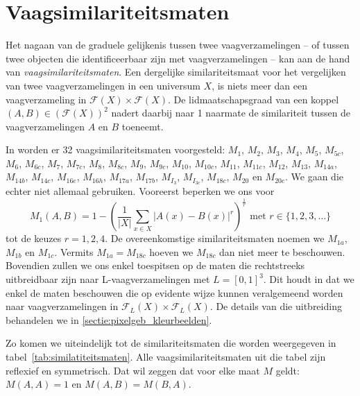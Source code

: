 \section{Vaagsimilariteitsmaten}
\label{sectie:vaagsimilariteitsmaten}

Het nagaan van de graduele gelijkenis tussen twee vaagverzamelingen -- of tussen twee objecten die 
identificeerbaar zijn met vaagverzamelingen -- kan aan de hand van \emph{vaagsimilariteitsmaten}. 
Een dergelijke similariteitsmaat voor het vergelijken van twee vaagverzamelingen in een 
universum $X$, is niets meer dan een vaagverzameling in $\mathcal{F}(X) \times \mathcal{F}(X)$. De 
lidmaatschapsgraad van een koppel $(A,B) \in (\mathcal{F}(X))^2$ nadert daarbij naar 1 naarmate 
de similariteit tussen de vaagverzamelingen $A$ en $B$ toeneemt.

In \cite{vanderweken:similariteitsmaten} worden er 32 vaagsimilariteitsmaten voorgesteld: $M_1$, $M_2$,
$M_3$, $M_4$, $M_5$, $M_{5c}$, $M_6$, $M_{6c}$, $M_7$, $M_{7c}$, $M_8$, $M_{8c}$, $M_9$, $M_{9c}$,
$M_{10}$, $M_{10c}$, $M_{11}$, $M_{11c}$, $M_{12}$, $M_{13}$, $M_{14a}$, $M_{14b}$, $M_{14c}$, 
$M_{16e}$, $M_{16h}$, $M_{17a}$, $M_{17b}$, $M_{I_3}$, $M_{I_{3c}}$, $M_{18c}$, $M_{20}$ en $M_{20c}$.
We gaan die echter niet allemaal gebruiken. Vooreerst beperken we ons voor
$$
M_1(A,B) = 1 - \left(\frac{1}{|X|} \sum_{x \in X} | A(x) - B(x)|^r\right)^\frac{1}{r} \textrm{ met } 
r \in \{1,2,3,\ldots\}
$$ tot de keuzes
$r=1,2,4$. De overeenkomstige similariteitsmaten noemen we $M_{1a}$, $M_{1b}$ en $M_{1c}$. Vermits
$M_{1a}=M_{18c}$ hoeven we $M_{18c}$ dan niet meer te beschouwen. 
Bovendien zullen we ons enkel
toespitsen op de maten die rechtstreeks uitbreidbaar zijn naar L-vaagverzamelingen met $L=[0,1]^3$. 
Dit houdt in dat we enkel de maten beschouwen die op evidente wijze kunnen veralgemeend worden naar
vaagverzamelingen in $\mathcal{F}_L(X) \times \mathcal{F}_L(X)$. De details van die
uitbreiding behandelen we in \ref{sectie:pixelgeb_kleurbeelden}. 

Zo komen we uiteindelijk tot
de similariteitsmaten die worden weergegeven in tabel~\ref{tab:similatiteitsmaten}. 
Alle vaagsimilariteitsmaten uit die tabel zijn reflexief en symmetrisch. Dat wil zeggen dat 
voor elke maat $M$ geldt: $M(A,A)=1$ en $M(A,B)=M(B,A)$. 

